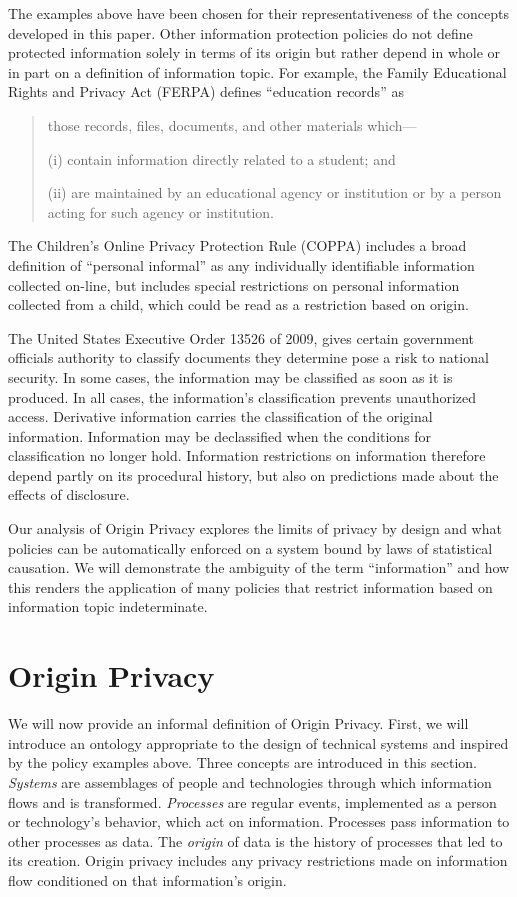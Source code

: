 \documentclass[../thesis.tex]{subfiles}
\begin{document}
The examples above have been chosen for their representativeness
of the concepts developed in this paper.
Other information protection policies do not define protected
information solely in terms of its origin but rather depend
in whole or in part on
a definition of information topic. For example,
the Family Educational Rights and Privacy Act (FERPA)
defines ``education records'' as
\begin{quote}
  those records, files, documents, and other materials which—
  
  (i) contain information directly related to a student; and

  (ii) are maintained by an educational agency or institution or by a person acting for such agency or institution.
\end{quote}

The Children's Online Privacy Protection Rule (COPPA)
includes a broad definition of ``personal informal''
as any individually identifiable information collected
on-line, but includes special restrictions on personal
information collected from a child, which could be
read as a restriction based on origin.

The United States Executive Order 13526 of 2009,
gives certain government officials authority to classify
documents they determine pose a risk to national
security.
In some cases, the information may be classified
as soon as it is produced.
In all cases, the information's classification
prevents unauthorized access.
Derivative information carries the classification
of the original information.
Information may be declassified when the
conditions for classification no longer hold.
Information restrictions on information
therefore depend partly on its procedural history,
but also on predictions made about the effects of
disclosure.

Our analysis of Origin Privacy explores the
limits of privacy by design and what policies
can be automatically enforced on a system
bound by laws of statistical causation.
We will demonstrate the ambiguity of
the term ``information'' and how this
renders the application of many policies
that restrict information based on information
topic indeterminate.


\section{Origin Privacy}
\label{sec:ontology}

We will now provide an informal definition of Origin Privacy.
First, we will introduce an ontology appropriate to the
design of technical systems and inspired by the policy
examples above.
Three concepts are introduced in this section.
\emph{Systems} are assemblages of people and technologies
through which information flows and is transformed.
\emph{Processes} are regular events, implemented as
a person or technology's behavior, which act on
information.
Processes pass information to other processes as data.
The \emph{origin} of data is the history of processes
that led to its creation.
Origin privacy includes any privacy restrictions made
on information flow conditioned on that information's
origin.
\end{document}
